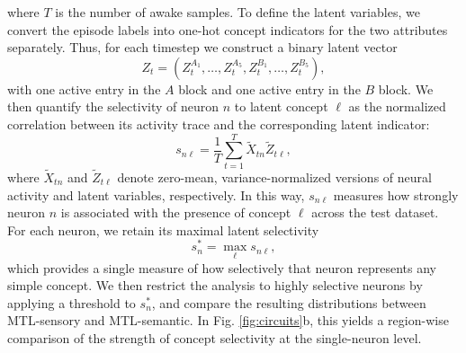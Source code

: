 \documentclass{article}
\begin{document}
where $T$ is the number of awake samples.
\newline\newline
To define the latent variables, we convert the episode labels into one-hot concept indicators for the two attributes separately. Thus, for each timestep we construct a binary latent vector
\[
Z_t = (Z_t^{A_1},\dots,Z_t^{A_5},Z_t^{B_1},\dots,Z_t^{B_5}),
\]
with one active entry in the $A$ block and one active entry in the $B$ block. We then quantify the selectivity of neuron $n$ to latent concept $\ell$ as the normalized correlation between its activity trace and the corresponding latent indicator:
\[
s_{n\ell}
=
\frac{1}{T}
\sum_{t=1}^{T}
\tilde{X}_{tn}\tilde{Z}_{t\ell},
\]
where $\tilde{X}_{tn}$ and $\tilde{Z}_{t\ell}$ denote zero-mean, variance-normalized versions of neural activity and latent variables, respectively. In this way, $s_{n\ell}$ measures how strongly neuron $n$ is associated with the presence of concept $\ell$ across the test dataset.
\newline\newline
For each neuron, we retain its maximal latent selectivity
\[
s_n^\ast = \max_{\ell} s_{n\ell},
\]
which provides a single measure of how selectively that neuron represents any simple concept. We then restrict the analysis to highly selective neurons by applying a threshold to $s_n^\ast$, and compare the resulting distributions between MTL-sensory and MTL-semantic. In Fig. \ref{fig:circuits}b, this yields a region-wise comparison of the strength of concept selectivity at the single-neuron level.
\end{document}
